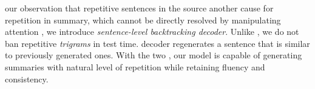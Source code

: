 \DIFaddend our observation that repetitive sentences in the source \DIFdelbegin {}\DIFdelend \DIFaddbegin {}\DIFaddend another cause for repetition in summary, 
which cannot be directly resolved by manipulating attention \DIFaddbegin {}\DIFaddend , 
we introduce \DIFdelbegin {}\DIFdelend \textit{sentence-level backtracking decoder}. 
Unlike \DIFaddbegin {}\DIFaddend \cite{PaulusXS17}, 
we do not ban repetitive \textit{trigrams} in test time. 
\DIFdelbegin {}\DIFdelend %
\DIFaddbegin {}\DIFaddend decoder regenerates a sentence that is similar to \DIFdelbegin {}\DIFdelend previously generated ones.
With the two \DIFdelbegin {}\DIFdelend \DIFaddbegin {}\DIFaddend , our model is capable of generating summaries with \DIFaddbegin {}\DIFaddend natural level of repetition while retaining fluency and consistency.
\DIFdelbegin %

\DIFdelend